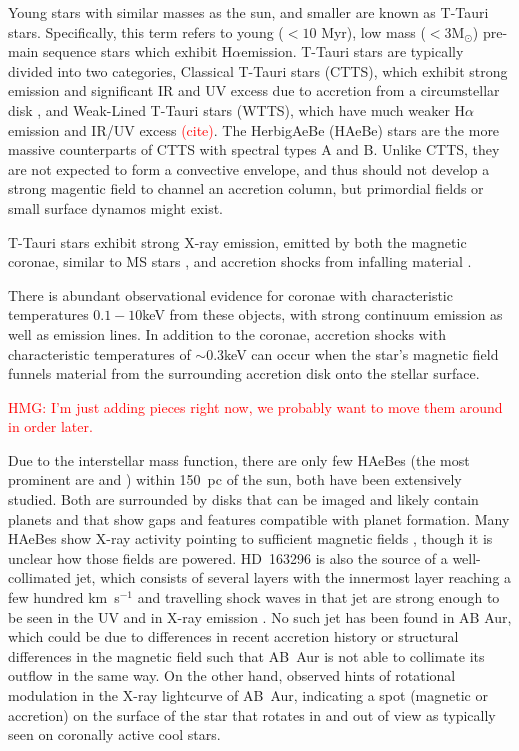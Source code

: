 \documentclass[twocolumn]{aastex631}
\newcommand\halpha{\ensuremath{{\text{H}\alpha}}}
\newcommand\msun{\ensuremath{\text{M}_\odot}}
\newcommand{\citesomething}[1]{\textcolor{red}{(cite#1)}}
\newcommand{\red}[1]{\textcolor{red}{#1}}
\begin{document}
Young stars with similar masses as the sun, and smaller are known as T-Tauri stars. Specifically, this term refers to young ($< 10$ Myr), low mass ($< 3\msun$) pre-main sequence stars which exhibit \halpha emission. T-Tauri stars are typically divided into two categories, Classical T-Tauri stars (CTTS), which exhibit strong emission and significant IR and UV excess due to accretion from a circumstellar disk , and Weak-Lined T-Tauri stars (WTTS), which have much weaker \halpha{} emission and IR/UV excess \citesomething{}. The HerbigAeBe (HAeBe) stars are the more massive counterparts of CTTS with spectral types A and B. Unlike CTTS, they are not expected to form a convective envelope, and thus should not develop a strong magentic field to channel an accretion column, but primordial fields or small surface dynamos might exist.

T-Tauri stars exhibit strong X-ray emission, emitted by both the magnetic coronae, similar to MS stars \citep[e.g. review by][]{gudel_x-ray_2009}, and accretion shocks from infalling material \citep[e.g.][]{edwards_spectroscopic_1994}. 

There is abundant observational evidence for coronae with characteristic temperatures $0.1-10$keV \citep{preibisch_evolution_2005} from these objects, with strong continuum emission as well as emission lines. In addition to the coronae, accretion shocks with characteristic temperatures of $\sim0.3$keV can occur when the star's magnetic field funnels material from the surrounding accretion disk onto the stellar surface. 

\red{HMG: I'm just adding pieces right now, we probably want to move them around in order later.}

Due to the interstellar mass function, there are only few HAeBes (the most prominent are  and ) within 150~pc of the sun, both have been extensively studied. Both are surrounded by disks that can be imaged and likely contain planets \citep[e.g.][]{2023ApJ...957...11D,2024arXiv241011939D} and that show gaps and features compatible with planet formation. Many HAeBes show X-ray activity pointing to sufficient magnetic fields \citep{2023MNRAS.521.2427R,2024MNRAS.530.3020A}, though it is unclear how those fields are powered. HD~163296 is also the source of a well-collimated jet, which consists of several layers with the innermost layer reaching a few hundred km~s$^{-1}$ and travelling shock waves in that jet are strong enough to be seen in the UV and in X-ray emission \citep[][and references therein]{2013A&A...552A.142G}. No such jet has been found in AB Aur, which could be due to differences in recent accretion history or structural differences in the magnetic field such that AB~Aur is not able to collimate its outflow in the same way. On the other hand, \cite{telleschi_first_2007} observed hints of rotational modulation in the X-ray lightcurve of AB~Aur, indicating a spot (magnetic or accretion) on the surface of the star that rotates in and out of view as typically seen on coronally active cool stars.
\end{document}
